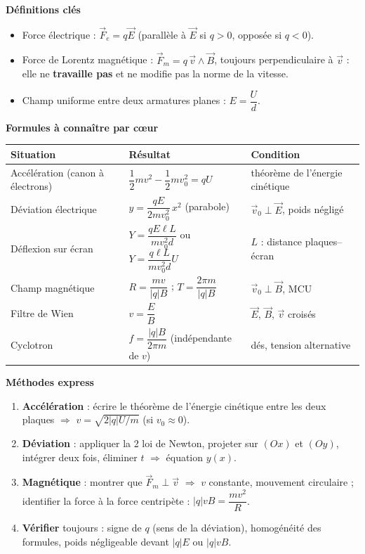 \documentclass[11pt]{article}
\newcommand{\cle}[1]{{\popxbold\color{popdark}#1}}
\begin{document}
\begin{bilan}
\textbf{Définitions clés}
\begin{itemize}
  \item \cle{Force électrique} : $\vec{F}_e = q\vec{E}$ (parallèle à $\vec{E}$ si $q>0$, opposée si $q<0$).
  \item \cle{Force de Lorentz magnétique} : $\vec{F}_m = q\,\vec{v}\wedge\vec{B}$, toujours perpendiculaire à $\vec{v}$ : elle ne \textbf{travaille pas} et ne modifie pas la norme de la vitesse.
  \item \cle{Champ uniforme} entre deux armatures planes : $E = \dfrac{U}{d}$.
\end{itemize}

\textbf{Formules à connaître par c\oe ur}
\begin{center}
\begin{tabularx}{\linewidth}{|l|X|X|}
\hline
\rowcolor{popblueL} \textbf{Situation} & \textbf{Résultat} & \textbf{Condition} \\
\hline
Accélération (canon à électrons) & $\dfrac{1}{2}mv^2 - \dfrac{1}{2}mv_0^2 = qU$ & théorème de l'énergie cinétique \\
\hline
Déviation électrique & $y = \dfrac{qE}{2mv_0^2}\,x^2$ (parabole) & $\vec{v}_0 \perp \vec{E}$, poids négligé \\
\hline
Déflexion sur écran & $Y = \dfrac{qE\ell L}{mv_0^2 d}$ ou $Y=\dfrac{q\ell L}{mv_0^2 d}U$ & $L$ : distance plaques--écran \\
\hline
Champ magnétique & $R = \dfrac{mv}{|q|B}$ ; $T = \dfrac{2\pi m}{|q|B}$ & $\vec{v}_0 \perp \vec{B}$, MCU \\
\hline
Filtre de Wien & $v = \dfrac{E}{B}$ & $\vec{E}$, $\vec{B}$, $\vec{v}$ croisés \\
\hline
Cyclotron & $f = \dfrac{|q|B}{2\pi m}$ (indépendante de $v$) & dés, tension alternative \\
\hline
\end{tabularx}
\end{center}

\textbf{Méthodes express}
\begin{enumerate}
  \item \textbf{Accélération} : écrire le théorème de l'énergie cinétique entre les deux plaques $\Rightarrow$ $v = \sqrt{2|q|U/m}$ (si $v_0 \approx 0$).
  \item \textbf{Déviation} : appliquer la 2 loi de Newton, projeter sur $(Ox)$ et $(Oy)$, intégrer deux fois, éliminer $t$ $\Rightarrow$ équation $y(x)$.
  \item \textbf{Magnétique} : montrer que $\vec{F}_m \perp \vec{v}$ $\Rightarrow$ $v$ constante, mouvement circulaire ; identifier la force à la force centripète : $|q|vB = \dfrac{mv^2}{R}$.
  \item \textbf{Vérifier} toujours : signe de $q$ (sens de la déviation), homogénéité des formules, poids négligeable devant $|q|E$ ou $|q|vB$.
\end{enumerate}
\end{bilan}
\end{document}
